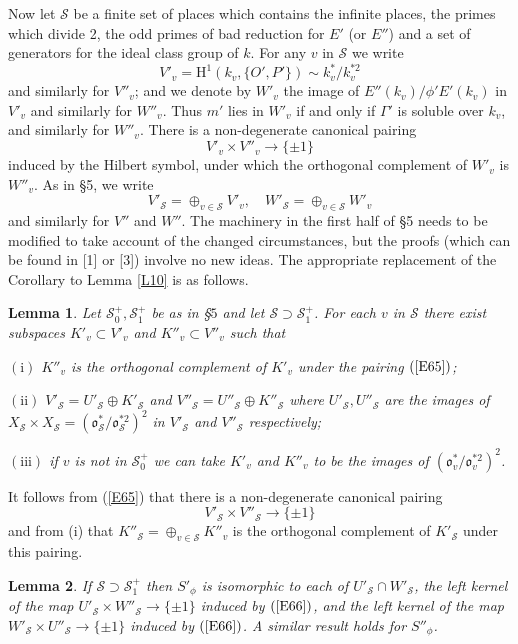 \documentclass[12pt]{article}
\def\fo{{\mathfrak o}}
\def\gG{{\Gamma}}
\def\sS{{\mathcal S}}
\def\beq{\begin{equation} \label}
\def\ble{\begin{lemma} \label}
\def\ele{\end{lemma}}
\newtheorem{lemma}{Lemma}
\begin{document}
Now let $\sS$ be a finite set of places which contains the
infinite places, the primes which divide 2, the odd primes of
bad reduction for $E'$ (or $E''$) and a set of generators for
the ideal class group of $k$. For any $v$ in $\sS$ we write
\[ V'_v=\mathrm{H}^1(k_v,\{O',P'\})\sim k^*_v/k^{*2}_v \]
and similarly for $V''_v$; and we denote by $W'_v$ the image
of $E''(k_v)/\phi'E'(k_v)$ in $V'_v$ and similarly for
$W''_v$. Thus $m'$ lies in $W'_v$ if and only if $\gG'$ is
soluble over $k_v$, and similarly for $W''_v$. There is
a non-degenerate canonical pairing
\beq{E65} V'_v\times V''_v\rightarrow\{\pm1\} \end{equation}
induced by the Hilbert symbol,
under which the orthogonal complement of $W'_v$ is $W''_v$.
As in \S5, we write
\[ V'_\sS=\oplus_{v\in\sS}V'_v, \quad
W'_\sS=\oplus_{v\in\sS}W'_v \]
and similarly for $V''$ and $W''$. The machinery in the first
half of \S5 needs to be modified to take account of the
changed circumstances, but the proofs (which can be found in
[1] or [3]) involve no new ideas. The appropriate
replacement of the Corollary to Lemma \ref{L10} is as follows.
\ble{L25} Let $\sS_0^+,\sS_1^+$ be as in \S$5$ and let
$\sS\supset\sS_1^+$. For each $v$ in $\sS$ there exist
subspaces $K'_v\subset V'_v$ and $K''_v\subset V''_v$ such
that

$\mathrm{(i)}$ $K''_v$ is the orthogonal complement of $K'_v$
under the pairing $(\ref{E65})$;

$\mathrm{(ii)}$ $V'_\sS=U'_\sS\oplus K'_\sS$ and
$V''_\sS=U''_\sS\oplus K''_\sS$ where $U'_\sS,U''_\sS$ are the
images of $X_\sS\times X_\sS=(\fo^*_\sS/\fo^{*2}_\sS)^2$ in
$V'_\sS$ and $V''_\sS$ respectively;

$\mathrm{(iii)}$ if $v$ is not in $\sS^+_0$ we can take $K'_v$
and $K''_v$ to be the images of $(\fo^*_v/\fo^{*2}_v)^2$.
\ele
It follows from (\ref{E65}) that there is a non-degenerate
canonical pairing
\beq{E66} V'_\sS\times V''_\sS\rightarrow\{\pm1\}
\end{equation}
and from (i) that $K''_\sS=\oplus_{v\in\sS}K''_v$ is the
orthogonal complement of $K'_\sS$ under this pairing.
\ble{L26} If $\sS\supset\sS^+_1$ then $S'_\phi$ is
isomorphic to each of $U'_\sS\cap W'_\sS$, the left kernel of
the map $U'_\sS\times W''_\sS\rightarrow\{\pm1\}$ induced by
$(\ref{E66})$, and the left kernel of the map $W'_\sS\times
U''_\sS\rightarrow\{\pm1\}$ induced by $(\ref{E66})$. A
similar result holds for $S''_\phi$.
\ele
\end{document}
